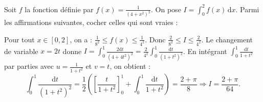 \begin{question}
Soit $f$ la fonction définie par $\displaystyle f(x)=\frac{1}{(4+x^2)^2}$. On pose $\displaystyle I=\int _0^2f(x)\,\mathrm{d}x$. Parmi les affirmations suivantes, cocher celles qui sont vraies :
\begin{answers}  
\end{answers}
\vskip2mm
\begin{explanations}
Pour tout $x\in [0,2]$, on a : $\displaystyle \frac{1}{8^2}\leq f(x)\leq \frac{1}{4^2}$. Donc $\displaystyle \frac{2}{8^2}\leq I\leq \frac{2}{4^2}$.
\vskip0mm
Le changement de variable $x=2t$ donne $\displaystyle I=\int _0^1\frac{2\mathrm{d}t}{(4+4t^2)^2}=\frac{2}{4^2}\int _0^1\frac{\mathrm{d}t}{(1+t^2)^2}$.
\vskip0mm En intégrant $\displaystyle \int _0^1\frac{\mathrm{d}t}{1+t^2}$ par parties avec $\displaystyle u=\frac{1}{1+t^2}$ et $v=t$, on obtient :
$$\int _0^1\frac{\mathrm{d}t}{(1+t^2)^2}=\frac{1}{2}\left(\left[\frac{t}{1+t^2}\right]_0^1+\int _0^1\frac{\mathrm{d}t}{1+t^2}\right)=\frac{2+\pi}{8} \Rightarrow I=\frac{2+\pi}{64}.$$
\end{explanations}
\end{question}

